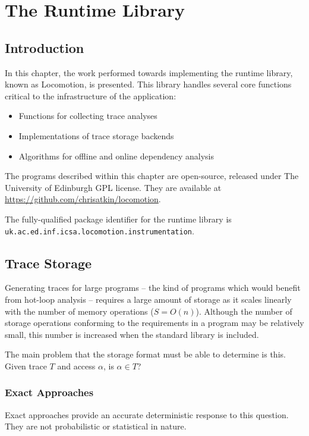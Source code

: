\chapter{The Runtime Library} \label{chp:runtime}
\section{Introduction} \label{sec:runtime/introduction}
In this chapter, the work performed towards implementing the runtime library, known as Locomotion, is presented. This library handles several core functions critical to the infrastructure of the application:

\begin{itemize}
	\item Functions for collecting trace analyses
	\item Implementations of trace storage backends
	\item Algorithms for offline and online dependency analysis
\end{itemize}

The programs described within this chapter are open-source, released under The University of Edinburgh GPL license. They are available at \url{https://github.com/chrisatkin/locomotion}.

The fully-qualified package identifier for the runtime library is\\\texttt{uk.ac.ed.inf.icsa.locomotion.instrumentation}.

\section{Trace Storage} \label{sec:runtime/storage}
Generating traces for large programs -- the kind of programs which would benefit from hot-loop analysis -- requires a large amount of storage as it scales linearly with the number of memory operations ($S=O(n)$). Although the number of storage operations conforming to the requirements in a program may be relatively small, this number is increased when the standard library is included.

The main problem that the storage format must be able to determine is this. Given trace $T$ and access $\alpha$, is $\alpha \in T$?
	
	\subsection{Exact Approaches} \label{sec:runtime/storage/exact}
	Exact approaches provide an accurate deterministic response to this question. They are not probabilistic or statistical in nature.
	

